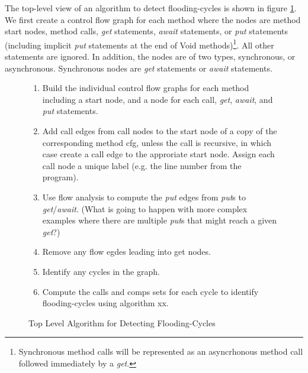 \documentclass[12pt]{article}%
\begin{document}

The top-level view of an algorithm to detect flooding-cycles is shown in figure \ref{flow-analysis}.
We first create a control flow graph for each method where the nodes are method start nodes, method calls, \emph{get} statements, 
\emph{await} statements,
or \emph{put} statements (including implicit \emph{put} statements at the end of Void methods)\footnote{
Synchronous method calls will be represented as an asyncrhonous method call followed immediately by a \emph{get}.}.
All other statements are ignored. 
In addition, the nodes are of two types,
synchronous, or asynchronous. Synchronous nodes are \emph{get} statements or \emph{await} statements.

\begin{figure}
\begin{shaded}
\begin{enumerate}
\item Build the individual control flow graphs for each method including a start node, and a node for each call, \emph{get}, \emph{await}, 
and \emph{put} statements.
\item Add call edges from call nodes to the start node of a copy of the corresponding method cfg, unless the call is recursive, in which case
create a call edge to the approriate start node. Assign each call node a unique label (e.g. the line number from the program). 
\item Use flow analysis to compute the \emph{put} edges from \emph{put}s to \emph{get}/\emph{await}. (What is going to happen with more complex examples
where there are multiple \emph{put}s that might reach a given \emph{get}?)
\item Remove any flow egdes leading into get nodes.
\item Identify any cycles in the graph.
\item Compute the calls and comps sets for each cycle to identify flooding-cycles using algorithm xx.
\end{enumerate}\end{shaded}%
\caption{\label{flow-analysis}
Top Level Algorithm for Detecting Flooding-Cycles}
\end{figure}
\end{document}
